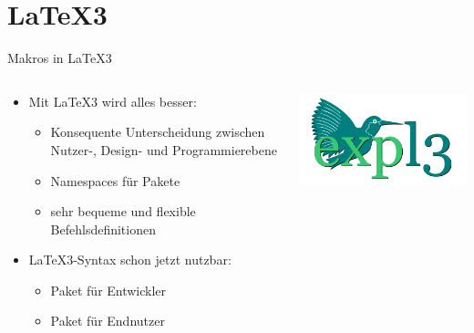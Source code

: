 \documentclass[
	vorläufig=true,
	datum=2017-01-26,
	titel={Komplexe Makros und Befehle},
	web=true,
	max,
]{../tex/latexkurs-slides}
\begin{document}
\section{\LaTeX3}
\begin{frame}{Makros in \LaTeX3}
	\begin{columns}\hspace{-2.5em}
		\begin{column}{.7\textwidth}
			\begin{itemize}
				\item Mit \LaTeX3 wird alles besser:
				\begin{itemize}
					\item Konsequente Unterscheidung zwischen Nutzer-, Design- und Programmierebene
					\item Namespaces für Pakete
					\item sehr bequeme und flexible Befehlsdefinitionen
				\end{itemize}
				\item \LaTeX3-Syntax schon jetzt nutzbar:
				\begin{itemize}
					\item Paket  für Entwickler
					\item Paket  für Endnutzer
				\end{itemize}
			\end{itemize}
		\end{column}
		\begin{column}{.2\textwidth}
			\vspace{-2cm}
			\includegraphics[width=1.5\textwidth]{11_expl3}
		\end{column}
	\end{columns}
\end{frame}
\end{document}
